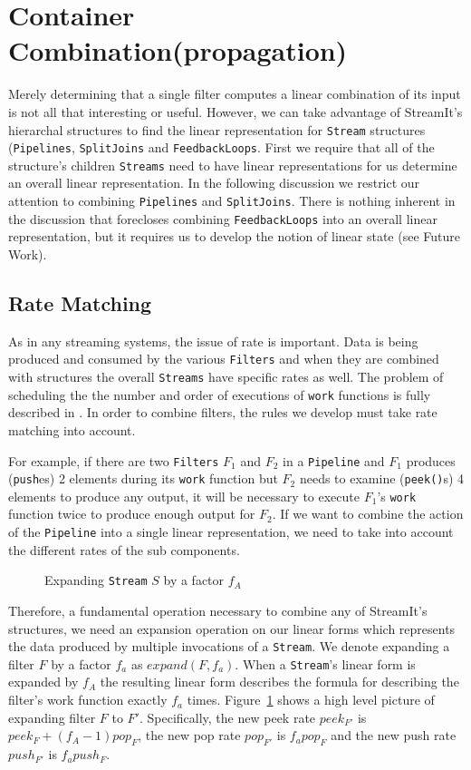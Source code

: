 \section{Container Combination(propagation)}
Merely determining that a single filter computes a linear combination of its input is not
all that interesting or useful. However, we can take advantage of StreamIt's hierarchal 
structures to find the linear representation for {\tt Stream} structures ({\tt Pipelines},
{\tt SplitJoins} and {\tt FeedbackLoops}. First we require that all of the structure's 
children {\tt Streams} need to have linear representations for us determine an overall
linear representation. In the following discussion we restrict our attention to combining
{\tt Pipelines} and {\tt SplitJoins}. There is nothing inherent in the discussion that 
forecloses combining {\tt FeedbackLoops} into an overall linear representation, but it
requires us to develop the notion of linear state (see Future Work).

\subsection{Rate Matching}

As in any streaming systems, the issue of rate is important. Data is being produced
and consumed by the various {\tt Filters} and when they are combined with structures
the overall {\tt Streams} have specific rates as well. The problem of scheduling the
the number and order of executions of {\tt work} functions is fully described in
\cite{karczma-thesis}. In order to combine filters, the rules we develop must take
rate matching into account. 

For example, if there are two
{\tt Filters} $F_1$ and $F_2$ in a {\tt Pipeline} and $F_1$ produces ({\tt push}es) 2 elements 
during its {\tt work} function but $F_2$ needs to examine ({\tt peek()}s) 4 elements 
to produce any output, it will be necessary to execute $F_1$'s {\tt work} function 
twice to produce enough output for $F_2$. If we want to combine the action of the 
{\tt Pipeline} into a single linear representation, we need to take into account
the different rates of the sub components.

\begin{figure}
\center
\epsfxsize=3.0in
\caption{Expanding {\tt Stream} $S$ by a factor $f_A$}
\label{fig:expanding-a-filter}
\end{figure}

Therefore, a fundamental operation necessary to combine any of StreamIt's structures, 
we need an expansion operation on our linear forms which represents the data produced
by multiple invocations of a {\tt Stream}. 
We denote expanding a filter $F$ by a factor $f_a$ as $expand(F, f_a)$.
When a {\tt Stream}'s linear form is expanded by $f_A$ 
the resulting linear form describes the formula for describing the filter's work
function exactly $f_a$ times. Figure~\ref{fig:expanding-a-filter} shows a 
high level picture of expanding filter $F$ to $F'$. Specifically, 
the new peek rate $peek_{F'}$ is  $peek_F + (f_A-1)pop_F$, the new pop rate
$pop_{F'}$ is  $f_{a}pop_F$ and the new push rate $push_{F'}$ is  $f_{a}push_F$.

